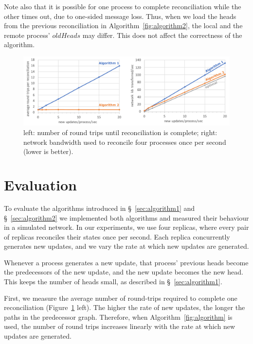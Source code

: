 \documentclass[a4paper,anonymous,USenglish]{lipics-v2019}
\begin{document}
Note also that it is possible for one process to complete reconciliation while the other times out, due to one-sided message loss.
Thus, when we load the heads from the previous reconciliation in Algorithm~\ref{fig:algorithm2}, the local and the remote process' $\mathit{oldHeads}$ may differ.
This does not affect the correctness of the algorithm.

\begin{figure}
  \includegraphics[width=\textwidth,keepaspectratio=true]{figs/evaluation.pdf}
  \caption{left: number of round trips until reconciliation is complete; right: network bandwidth used to reconcile four processes once per second (lower is better).}
  \label{fig:evaluation}
\end{figure}

\section{Evaluation}\label{sec:evaluation}

To evaluate the algorithms introduced in \S~\ref{sec:algorithm1} and \S~\ref{sec:algorithm2} we implemented both algorithms and measured their behaviour in a simulated network.
In our experiments, we use four replicas, where every pair of replicas reconciles their states once per second.
Each replica concurrently generates new updates, and we vary the rate at which new updates are generated.

Whenever a process generates a new update, that process' previous heads become the predecessors of the new update, and the new update becomes the new head.
This keeps the number of heads small, as described in \S~\ref{sec:algorithm1}.

First, we measure the average number of round-trips required to complete one reconciliation (Figure~\ref{fig:evaluation} left).
The higher the rate of new updates, the longer the paths in the predecessor graph.
Therefore, when Algorithm~\ref{fig:algorithm} is used, the number of round trips increases linearly with the rate at which new updates are generated.
\end{document}

